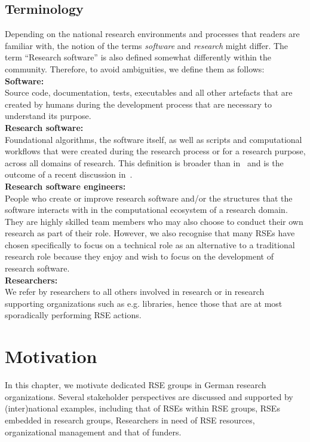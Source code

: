 \documentclass[a4paper]{article}
\makeatletter
\newcommand*{\eg}{e.g.\@\xspace}
\makeatother
\begin{document}
\subsection{Terminology}
Depending on the national research
environments and processes that readers are familiar with, the notion of the terms \emph{software} and \emph{research} might differ.
The term “Research software” is also defined somewhat differently within the community.
Therefore, to avoid ambiguities, we define them as follows:\\
\textbf{Software:}\\
Source code, documentation, tests, executables
and all other artefacts that are created by humans during the development process
that are necessary to understand its purpose.\\
\textbf{Research software:}\\
Foundational algorithms, the software itself,
as well as scripts and computational workflows that were created
during the research process or for a research purpose, across all domains of research.
This definition is broader than in~\autocite{FAIR4RS} and is the outcome of a recent
discussion in~\autocite{Gruenpeter2021}.\\
\textbf{Research software engineers:}\\
People who
create or improve research software and/or the structures that the software interacts with
in the computational ecosystem of a research domain.
They are highly skilled team members who may also choose to conduct their own research as
part of their role.
However, we also recognise that many RSEs have chosen specifically to focus on a technical
role as an alternative to a traditional research role because they enjoy and wish to focus
on the development of research software.\\
\textbf{Researchers:}\\
We refer by researchers to all others involved in research or in research supporting organizations such as \eg libraries,
hence those that are at most sporadically performing RSE actions.

\section{Motivation}

In this chapter, we motivate dedicated RSE groups in German research organizations.
Several stakeholder perspectives are discussed and supported by (inter)national examples, including that of RSEs within RSE groups, RSEs embedded in research groups, Researchers in need of RSE resources, organizational management and that of funders.
\end{document}
